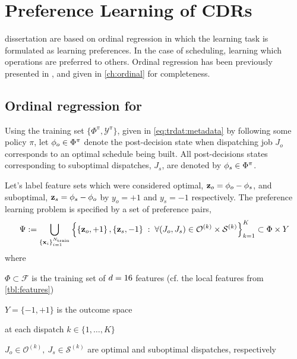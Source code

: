 
\chapter{Preference Learning of CDRs}\label{ch:prefmodels} 
 dissertation are based on ordinal regression in which the learning task is formulated as learning preferences. In the case of scheduling, learning which operations are preferred to others. Ordinal regression has been previously presented in \cite{Ru06:PPSN}, and given in \cref{ch:ordinal} for completeness. 

\section{Ordinal regression for \jsp}
Using the training set $\{\Phi^\pi,\mathcal{Y}^\pi\}$, given in 
\cref{eq:trdat:metadata} by following some policy $\pi$, 
let ${\mathbf{\phi}}_{o}\in\Phi^\pi$ denote the post-decision state when dispatching 
job $J_o$ corresponds to an optimal schedule being built. All post-decisions 
states corresponding to suboptimal dispatches, $J_s$, are denoted by 
${\mathbf{\phi}}_{s}\in\Phi^\pi$. 

Let's label feature sets which were considered optimal, 
$\mathbf{z}_{o}={\mathbf{\phi}}_{o}-{\mathbf{\phi}}_{s}$, and suboptimal, 
$\mathbf{z}_{s}={\mathbf{\phi}}_{s}-{\mathbf{\phi}}_{o}$ by $y_o=+1$ and $y_s=-1$ respectively. 
The preference learning problem is specified by a set of preference pairs,
\begin{equation}\label{eq:Psi:jsp}
	\Psi := \bigcup_{\{\vec{x}_i\}_{i=1}^{N_{\train}}}
    \condset{
        \left\{\vec{z}_o,+1\right\},\left\{\vec{z}_s,-1\right\}}{\forall 
        (J_o,J_s) 
        \in \mathcal{O}^{(k)} \times \mathcal{S}^{(k)}}_{k=1}^K 
    \subset \Phi\times Y 
\end{equation}
where 
\begin{enumerate*}
  \item $\Phi\subset\mathcal{F}$ is the training set of $d=16$ 
  features (cf. the local features from \cref{tbl:features}) 
  \item $Y=\{-1,+1\}$ is the outcome space
  \item at each dispatch $k\in\{1,\ldots,K\}$
  \item $J_o\in\mathcal{O}^{(k)},~J_s\in \mathcal{S}^{(k)}$
  are optimal and suboptimal dispatches, respectively
\end{enumerate*}

